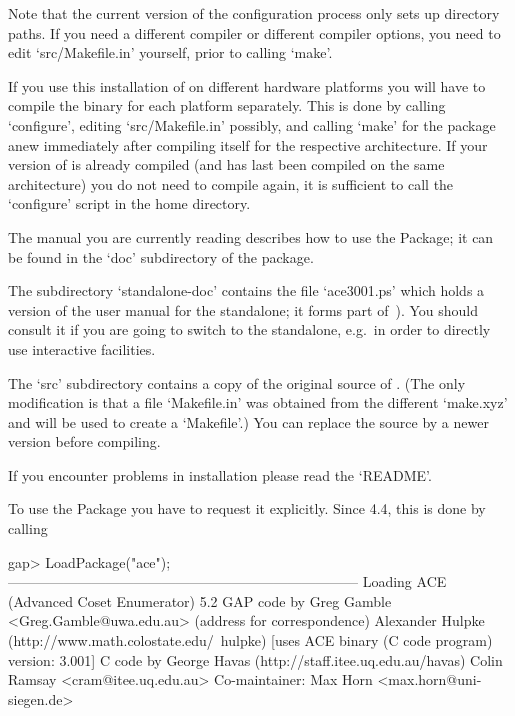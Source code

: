 Note that the  current version of the configuration  process only sets
up  directory paths.  If you  need a  different compiler  or different
compiler options, you need to edit `src/Makefile.in'  yourself,  prior
to calling `make'.

If you use this installation of {\GAP} on different hardware platforms
you will have to compile the binary for each platform separately. This
is done by calling `configure',  editing  `src/Makefile.in'  possibly,
and calling `make' for the package anew  immediately  after  compiling
{\GAP} itself for the respective  architecture.  If  your  version  of
{\GAP} is already compiled (and has last been  compiled  on  the  same
architecture)  you  do  not  need  to  compile  {\GAP}  again,  it  is
sufficient  to  call  the  `configure'  script  in  the  {\GAP}   home
directory.

The manual you are currently reading describes how to use  the  {\ACE}
Package; it can be found in the `doc' subdirectory of the package. %
%
%

The subdirectory `standalone-doc' contains the file `ace3001.ps' which
holds a version of the user manual for the {\ACE} standalone; it forms
part of~\cite{Ram99ace}). You should consult  it  if  you  are  going  to
switch to  the  {\ACE}  standalone,  e.g.~in  order  to  directly  use
interactive facilities.

The  `src' subdirectory  contains a  copy  of the  original source  of
{\ACE}.  (The  only modification  is  that  a  file `Makefile.in'  was
obtained from  the different `make.xyz' and  will be used  to create a
`Makefile'.)  You  can replace  the source by  a newer  version before
compiling.

If you encounter problems in installation please read the `README'.


To use the {\ACE} Package you have  to  request  it  explicitly. Since
{\GAP} 4.4, this is done by calling

\beginexample
gap> LoadPackage("ace");
---------------------------------------------------------------------------
Loading    ACE (Advanced Coset Enumerator) 5.2
GAP code by Greg Gamble <Greg.Gamble@uwa.edu.au> (address for correspondence)
       Alexander Hulpke (http://www.math.colostate.edu/~hulpke)
           [uses ACE binary (C code program) version: 3.001]
C code by  George Havas (http://staff.itee.uq.edu.au/havas)
           Colin Ramsay <cram@itee.uq.edu.au>
Co-maintainer: Max Horn <max.horn@uni-siegen.de>


